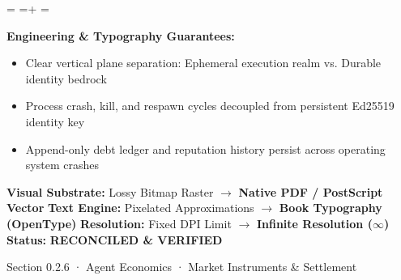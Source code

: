 \documentclass[10pt,a4paper,landscape]{article}
\newcommand{\pdautoscale}[2]{%
  \pdmaxh=#1\relax
  \pdmaxw=#2\relax
  \sbox{\pdscaledbox}{\usebox{\pdfigbox}}%
  \pdcurh=\dimexpr\ht\pdscaledbox+\dp\pdscaledbox\relax
  \pdcurw=\wd\pdscaledbox
  \ifdim\dimexpr\pdcurw * 100 / \pdmaxw\relax > \dimexpr\pdcurh * 100 / \pdmaxh\relax
    \resizebox{\pdmaxw}{!}{\usebox{\pdscaledbox}}%
  \else
    \resizebox{!}{\pdmaxh}{\usebox{\pdscaledbox}}%
  \fi
}
\begin{document}
\begin{minipage}[t]{0.492\linewidth}
  \begin{tcolorbox}[
    colback=pdcobalt!3,colframe=pdcobalt!85!black,arc=1.5pt,
    boxrule=0.7pt,top=1.5pt,bottom=1.5pt,left=4pt,right=4pt,
    title={\pdgrotesk\footnotesize\bfseries \color{white} B. Authoritative Native Vector Replacement \hfill \texttt{.tex / TikZ / PGF}}
  ]
    \begin{minipage}[c][8.3cm][c]{\linewidth}
      \centering
      \sbox{\pdfigbox}{}
      \pdautoscale{8.0cm}{\linewidth}
    \end{minipage}
    \tcblower
    \begin{minipage}[t][2.0cm][t]{\linewidth}
      \pdgrotesk\scriptsize
      \textbf{{\color{pdcobalt} Engineering \& Typography Guarantees:}}\\
      \begin{itemize}[leftmargin=9pt,itemsep=0pt,topsep=0.5pt,parsep=0pt]
        \item Clear vertical plane separation: Ephemeral execution realm vs. Durable identity bedrock
        \item Process crash, kill, and respawn cycles decoupled from persistent Ed25519 identity key
        \item Append-only debt ledger and reputation history persist across operating system crashes
      \end{itemize}
    \end{minipage}
  \end{tcolorbox}
\end{minipage}

\vspace*{0.05cm}
\noindent
\begin{tcolorbox}[
  colback=hhpaper,colframe=hhgray!35,arc=1.5pt,boxrule=0.4pt,
  top=1.5pt,bottom=1.5pt,left=6pt,right=6pt
]
  \pdgrotesk\scriptsize
  \noindent
  \textbf{Visual Substrate:} Lossy Bitmap Raster $\rightarrow$ \textbf{\color{pdcobalt}Native PDF / PostScript Vector}\hfill
  \textbf{Text Engine:} Pixelated Approximations $\rightarrow$ \textbf{\color{pdcobalt}Book Typography (OpenType)}\hfill
  \textbf{Resolution:} Fixed DPI Limit $\rightarrow$ \textbf{\color{pdcobalt}Infinite Resolution ($\infty$)}\hfill
  \textbf{Status:} \textbf{\color{pdteal}RECONCILED \& VERIFIED}
\end{tcolorbox}
\clearpage

\noindent
\begin{minipage}[t]{\linewidth}
  \hfill
  {\pdgrotesk\footnotesize\color{hhgray} Section 0.2.6 · Agent Economics · Market Instruments \& Settlement}\\
  \vspace*{0.03cm}
  \noindent{\color{hhgray!40}\rule{\linewidth}{0.5pt}}
\end{minipage}
\end{document}
